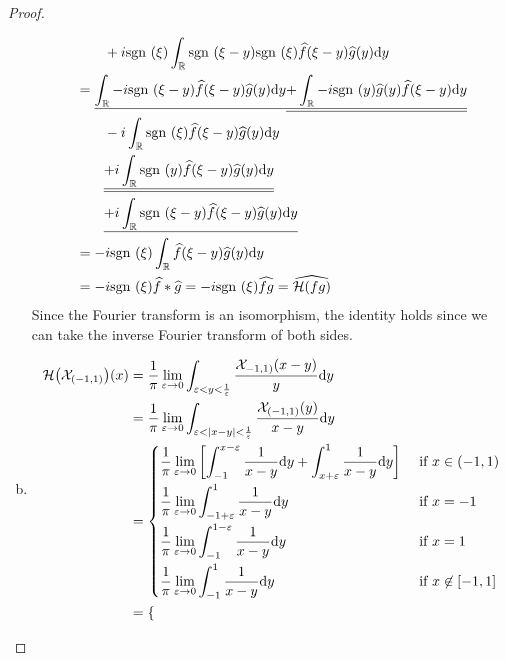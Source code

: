 \documentclass{article} %
\theoremstyle{plain}
\newcommand{\E}{\varepsilon}
\def\Rl{\mathbb{R}}
\newcommand{\sgn}{\text{\rm sgn }}
\newcommand{\Hilb}{\mathcal{H}}
\numberwithin{equation}{section} %
\numberwithin{figure}{section} %
\numberwithin{table}{section} %
\begin{document}
\begin{proof}
\begin{enumerate}[(a)]
\begin{align*}
            &\qquad +i\sgn(\xi) \int_\Rl \sgn(\xi - y)\sgn(\xi)\widehat{f}(\xi - y)\widehat{g}(y) \dd y \\
            &= \underline{\int_\Rl -i\sgn(\xi-y)\widehat{f}(\xi - y)\widehat{g}(y)\dd y} \underline{\underline{+ \int_\Rl -i\sgn(y)\widehat{g}(y)\widehat{f}(\xi - y) \dd y}} \\
            &\qquad - i\int_\Rl \sgn(\xi)\widehat{f}(\xi - y)\widehat{g}(y)\dd y \\
            &\qquad \underline{\underline{+ i \int_\Rl \sgn(y)\widehat{f}(\xi - y)\widehat{g}(y)\dd y}} \\
            &\qquad \underline{+i \int_\Rl \sgn(\xi - y)\widehat{f}(\xi - y)\widehat{g}(y) \dd y} \\
            &= -i\sgn(\xi)\int_\Rl \widehat{f}(\xi - y)\widehat{g}(y) \dd y \\
            &= -i\sgn(\xi)\widehat{f}*\widehat{g} = -i\sgn(\xi)\widehat{fg} = \widehat{\Hilb(fg)}
        \end{align*}
        Since the Fourier transform is an isomorphism, the identity holds since we can take the inverse Fourier transform of both sides.
        \item \begin{align*}
            \Hilb\qty(\mathcal{X}_{(-1,1)})(x) &= \frac{1}{\pi}\lim_{\E \rightarrow 0}\int_{\E < y < \frac{1}{\E}} \frac{\mathcal{X}_{-1, 1)}(x - y)}{y} \dd y \\
            &= \frac{1}{\pi}\lim_{\E \rightarrow 0}\int_{\E < \abs{x - y} < \frac{1}{\E}}\frac{\mathcal{X}_{(-1,1)}(y)}{x - y} \dd y \\
            &= \begin{cases}
                \displaystyle\frac{1}{\pi}\lim_{\E\rightarrow 0}\qty[\int_{-1}^{x - \E}\frac{1}{x - y}\dd y + \int_{x + \E}^1 \frac{1}{x - y}\dd y] & \text{ if } x \in (-1, 1) \\[.3cm]
                \displaystyle\frac{1}{\pi}\lim_{\E\rightarrow 0}\int_{-1 + \E}^1 \frac{1}{x - y} \dd y & \text{ if } x = -1 \\[.3cm]
                \displaystyle\frac{1}{\pi}\lim_{\E\rightarrow 0}\int_{-1}^{1 - \E} \frac{1}{x - y} \dd y & \text{ if } x = 1 \\[.3cm]
                \displaystyle\frac{1}{\pi}\lim_{\E\rightarrow 0}\int_{-1}^1 \frac{1}{x - y} \dd y & \text{ if } x \not\in [-1, 1]
            \end{cases} \\
            &= \begin{cases}

\end{cases}
\end{align*}
\end{enumerate}
\end{proof}
\end{document}
